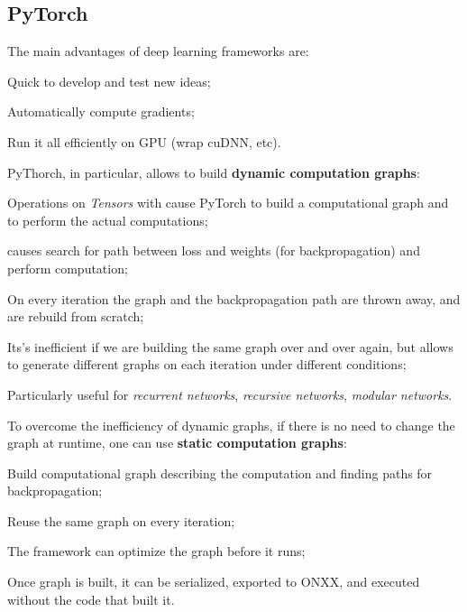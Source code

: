 \subsection{PyTorch}\label{sec:dl-pytorch}

The main advantages of deep learning frameworks are:
\begin{myitem}
    \item Quick to develop and test new ideas;
    \item Automatically compute gradients;
    \item Run it all efficiently on GPU (wrap cuDNN, etc).
\end{myitem}

PyThorch, in particular, allows to build \textbf{dynamic computation graphs}:
\begin{myitem}
    \item Operations on \textit{Tensors} with  cause PyTorch to build a computational graph and to perform the actual computations;
    \item {} causes search for path between loss and weights (for backpropagation) and perform computation;
    \item On every iteration the graph and the backpropagation path are thrown away, and are rebuild from scratch;
    \item Its's inefficient if we are building the same graph over and over again, but allows to generate different graphs on each iteration under different conditions;
    \item Particularly useful for \textit{recurrent networks}, \textit{recursive networks}, \textit{modular networks}.
\end{myitem}

To overcome the inefficiency of dynamic graphs, if there is no need to change the graph at runtime, one can use \textbf{static computation graphs}:
\begin{myitem}
    \item Build computational graph describing the computation and finding paths for backpropagation;
    \item Reuse the same graph on every iteration;
    \item The framework can optimize the graph before it runs;
    \item Once graph is built, it can be serialized, exported to ONXX, and executed without the code that built it.
\end{myitem}

